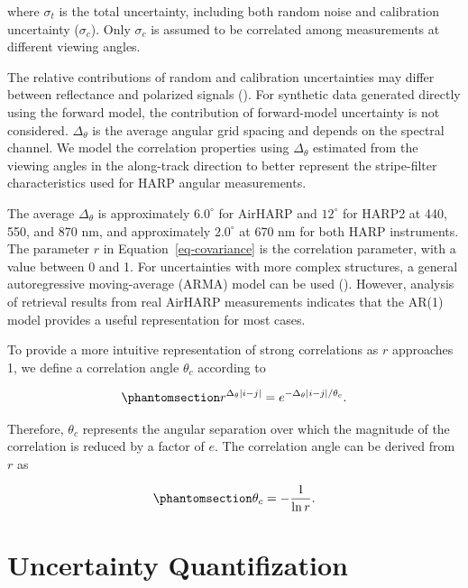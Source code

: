 \documentclass[
  11pt,
  letterpaper,
]{scrreprt}
\begin{document}
where \(\sigma_t\) is the total uncertainty, including both random noise
and calibration uncertainty (\(\sigma_c\)). Only \(\sigma_c\) is assumed
to be correlated among measurements at different viewing angles.

The relative contributions of random and calibration uncertainties may
differ between reflectance and polarized signals
(). For
synthetic data generated directly using the forward model, the
contribution of forward-model uncertainty is not considered.
\(\Delta_\theta\) is the average angular grid spacing and depends on the
spectral channel. We model the correlation properties using
\(\Delta_\theta\) estimated from the viewing angles in the along-track
direction to better represent the stripe-filter characteristics used for
HARP angular measurements.

The average \(\Delta_\theta\) is approximately \(6.0^\circ\) for AirHARP
and \(12^\circ\) for HARP2 at 440, 550, and 870 nm, and approximately
\(2.0^\circ\) at 670 nm for both HARP instruments. The parameter \(r\)
in Equation~\ref{eq-covariance} is the correlation parameter, with a
value between 0 and 1. For uncertainties with more complex structures, a
general autoregressive moving-average (ARMA) model can be used
(). However, analysis of
retrieval results from real AirHARP measurements indicates that the
AR(1) model provides a useful representation for most cases.

To provide a more intuitive representation of strong correlations as
\(r\) approaches 1, we define a correlation angle \(\theta_c\) according
to

\begin{equation}\phantomsection\label{eq-correlation-angle}{
r^{\Delta_\theta |i-j|}
=
e^{-\Delta_\theta |i-j|/\theta_c}.
}\end{equation}

Therefore, \(\theta_c\) represents the angular separation over which the
magnitude of the correlation is reduced by a factor of \(e\). The
correlation angle can be derived from \(r\) as

\begin{equation}\phantomsection\label{eq-thetac2r}{
\theta_c
=
-\frac{1}{\ln r}.
}\end{equation}

\section{Uncertainty Quantifization}\label{uncertainty-quantifization}
\end{document}
